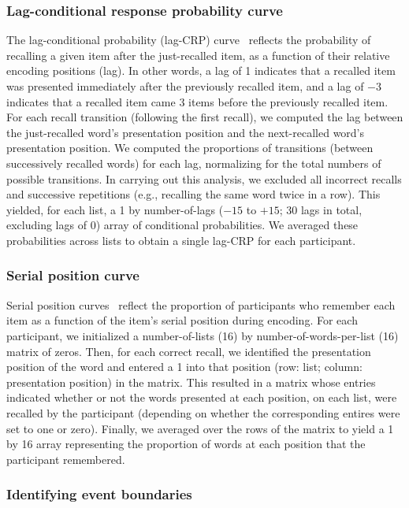 \documentclass[11pt]{article}
\begin{document}
\subsubsection*{Lag-conditional response probability curve}

The lag-conditional probability (lag-CRP) curve~\citep{Kaha96} reflects the
probability of recalling a given item after the just-recalled item, as a
function of their relative encoding positions (lag). In other words, a lag of 1
indicates that a recalled item was presented immediately after the previously
recalled item, and a lag of $−3$ indicates that a recalled item came 3 items
before the previously recalled item. For each recall transition (following the
first recall), we computed the lag between the just-recalled word's
presentation position and the next-recalled word's presentation position. We
computed the proportions of transitions (between successively recalled words)
for each lag, normalizing for the total numbers of possible transitions. In
carrying out this analysis, we excluded all incorrect recalls and successive
repetitions (e.g., recalling the same word twice in a row). This yielded, for
each list, a 1 by number-of-lags ($-15$ to $+15$; 30 lags in total, excluding
lags of 0) array of conditional probabilities. We averaged these probabilities
across lists to obtain a single lag-CRP for each participant.



\subsubsection*{Serial position curve}

Serial position curves~\citep{Murd62a} reflect the proportion of participants
who remember each item as a function of the item’s serial position during
encoding. For each participant, we initialized a number-of-lists (16) by
number-of-words-per-list (16) matrix of zeros. Then, for each correct recall,
we identified the presentation position of the word and entered a 1 into that
position (row: list; column: presentation position) in the matrix. This
resulted in a matrix whose entries indicated whether or not the words presented
at each position, on each list, were recalled by the participant (depending on
whether the corresponding entires were set to one or zero). Finally, we
averaged over the rows of the matrix to yield a 1 by 16 array representing the
proportion of words at each position that the participant remembered.

\subsubsection*{Identifying event boundaries}
\end{document}
